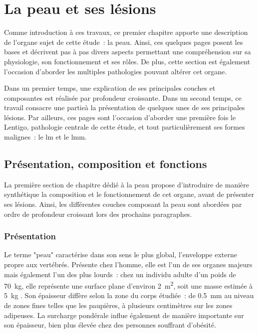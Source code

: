 \renewcommand{\thechapter}{\arabic{chapter}}
\setcounter{chapter}{0}

\chapter{La peau et ses lésions}
\label{chap:chapter_1}
\chapterintro
Comme introduction à ces travaux, ce premier chapitre apporte une description de l'organe sujet de cette étude~: la peau. Ainsi, ces quelques pages posent les bases et décrivent pas à pas divers aspects permettant une compréhension sur sa physiologie, son fonctionnement et ses rôles. De plus, cette section est également l'occasion d'aborder les multiples pathologies pouvant altérer cet organe.\par

Dans un premier temps, une explication de ses principales couches et composantes est réalisée par profondeur croissante. Dans un second temps, ce travail consacre une partieà la présentation de quelques unes de ses principales lésions. Par ailleurs, ces pages sont l'occasion d'aborder une première fois le Lentigo, pathologie centrale de cette étude, et tout particulièrement ses formes malignes~: le \acrfull{lm} et le \acrfull{lmm}.\par
\newpage

\section{Présentation, composition et fonctions}
La première section de chapitre dédié à la peau propose d'introduire de manière synthétique la composition et le fonctionnement de cet organe, avant de présenter ses lésions. Ainsi, les différentes couches composant la peau sont abordées par ordre de profondeur croissant lors des prochains paragraphes.\par

\subsection{Présentation}
Le terme "peau" caractérise dans son sens le plus global, l’enveloppe externe propre aux vertébrés. Présente chez l’homme, elle est l’un de ses organes majeurs mais également l’un des plus lourds~: chez un individu adulte d’un poids de \SI{70}{\kilo\gram}, elle représente une surface plane d’environ \SI{2}{\metre\squared}, soit une masse estimée à \SI{5}{\kilo\gram} \cite{McGrath2010}. Son épaisseur diffère selon la zone du corps étudiée~: de \SI{0,5}{\milli\metre} au niveau de zones fines telles que les paupières, à plusieurs centimètres sur les zones adipeuses. La surcharge pondérale influe également de manière importante sur son épaisseur, bien plus élevée chez des personnes souffrant d'obésité.\par

